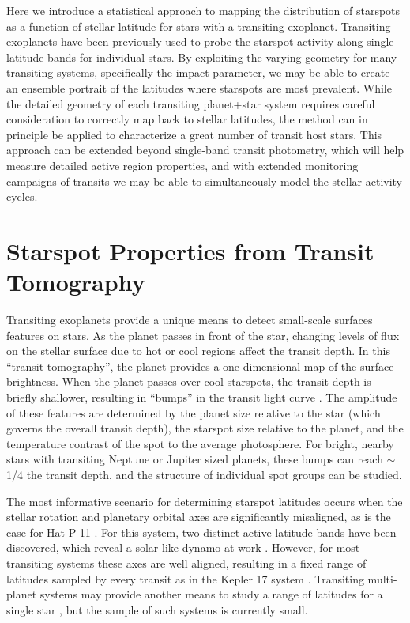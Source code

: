 \documentclass[preprint2]{aastex61}
\begin{document}
Here we introduce a statistical approach to mapping the distribution of starspots as a function of stellar latitude for stars with a transiting exoplanet. Transiting exoplanets have been previously used to probe the starspot activity along single latitude bands for individual stars. By exploiting the varying geometry for many transiting systems, specifically the impact parameter, we may be able to create an ensemble portrait of the latitudes where starspots are most prevalent. While the detailed geometry of each transiting planet+star system requires careful consideration to correctly map back to stellar latitudes, the method can in principle be applied to characterize a great number of transit host stars. This approach can be extended beyond single-band transit photometry, which will help measure detailed active region properties, and with extended monitoring campaigns of transits we may be able to simultaneously model the stellar activity cycles.





\section{Starspot Properties from Transit Tomography}
\label{sec:transit}

Transiting exoplanets provide a unique means to detect small-scale surfaces features on stars. As the planet passes in front of the star, changing levels of flux on the stellar surface due to hot or cool regions affect the transit depth. In this ``transit tomography'', the planet provides a one-dimensional map of the surface brightness. When the planet passes over cool starspots, the transit depth is briefly shallower, resulting in ``bumps'' in the transit light curve \citep{silva2003}. The amplitude of these features are determined by the planet size relative to the star (which governs the overall transit depth), the starspot size relative to the planet, and the temperature contrast of the spot to the average photosphere. For bright, nearby stars with transiting Neptune or Jupiter sized planets, these bumps can reach $\sim$1/4 the transit depth, and the structure of individual spot groups can be studied. 

The most informative scenario for determining starspot latitudes occurs when the stellar rotation and planetary orbital axes are significantly misaligned, as is the case for Hat-P-11 \citep{sanchis-ojeda2011}. For this system, two distinct active latitude bands have been discovered, which reveal a solar-like dynamo at work \citep{morris2017}. However, for most transiting systems these axes are well aligned, resulting in a fixed range of latitudes sampled by every transit as in the Kepler 17 system \citep{davenport_phd}. Transiting multi-planet systems may provide another means to study a range of latitudes for a single star \citep[e.g. Kepler 186; ][]{kepler186f}, but the sample of such systems is currently small.
\end{document}
